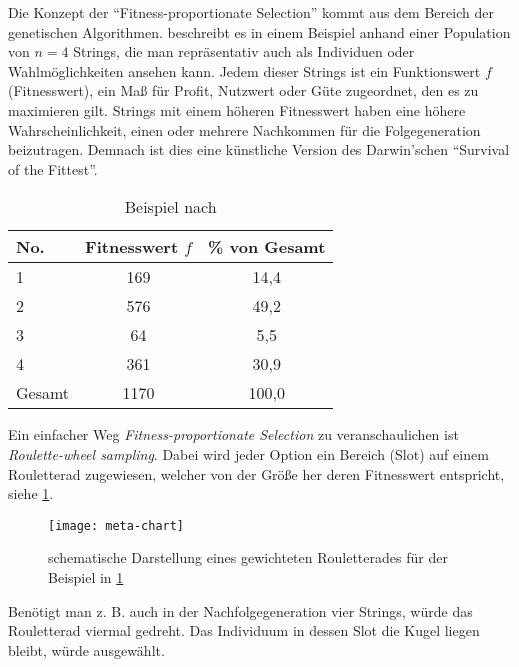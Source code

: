 Die Konzept der \enquote{Fitness-proportionate Selection} kommt aus dem Bereich der genetischen Algorithmen. 
\cite{gen-algo} beschreibt es in einem Beispiel anhand einer Population von $n=4$ Strings, die man repräsentativ auch als Individuen oder Wahlmöglichkeiten ansehen kann. 
Jedem dieser Strings ist ein Funktionswert $f$ (Fitnesswert), ein Maß für Profit, Nutzwert oder Güte zugeordnet, den es zu maximieren gilt. 
Strings mit einem höheren Fitnesswert haben eine höhere Wahrscheinlichkeit, einen oder mehrere Nachkommen für die Folgegeneration beizutragen.
Demnach ist dies eine künstliche Version des Darwin'schen \enquote{Survival of the Fittest}.

\begin{table}[ht]
\begin{center}
\setlength{\tabcolsep}{0.5em} %
{\renewcommand{\arraystretch}{1.2}%
\begin{tabular}{| l  c  c |}
\hline 
No. & Fitnesswert $f$ & \% von Gesamt \\ \hline 
1 & 169 & 14,4 \\ 
2 & 576 & 49,2 \\ 
3 & 64 & 5,5 \\ 
4 & 361 & 30,9 \\ \hline
Gesamt & 1170 & 100,0 \\ \hline
\end{tabular}
}
\caption{Beispiel nach \cite[Table 1.1]{gen-algo}}
\label{tab:beispiel-tabelle-roulette}
\end{center}
\end{table}

Ein einfacher Weg \textit{Fitness-proportionate Selection} zu veranschaulichen ist \textit{Roulette-wheel sampling}. 
Dabei wird jeder Option ein Bereich (Slot) auf einem Rouletterad zugewiesen, welcher von der Größe her deren Fitnesswert entspricht, siehe \cref{figure:meta-chart}. 

\begin{figure}[hptb]
 \centering
 \texttt{[image: meta-chart]}
 \caption[gewichtetes Roulette-Rad (fitness-proportionate selection]
 		{schematische Darstellung eines gewichteten Rouletterades für der Beispiel in \cref{tab:beispiel-tabelle-roulette}}
 \label{figure:meta-chart}
\end{figure}

Benötigt man z. B. auch in der Nachfolgegeneration vier Strings, würde das Rouletterad viermal gedreht.
Das Individuum in dessen Slot die Kugel liegen bleibt, würde ausgewählt.

